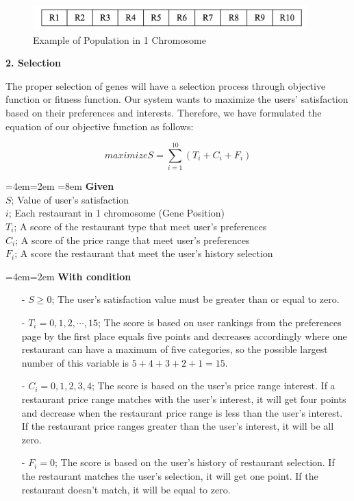 \documentclass[12pt,oneside,openright,a4paper]{cpe-english-project}
\newenvironment{blockquote}{%
  \par%
  \medskip
  \leftskip=4em\rightskip=2em%
  \noindent\ignorespaces}{%
  \par\medskip}
\begin{document}
\begin{figure}[H]\centering
\includegraphics[width=300pt]{./images/3ga_init.png}
\caption{Example of Population in 1 Chromosome}\label{fig:3ga_init}
\end{figure}\vspace{-24pt}

\textbf{2. Selection}\par

The proper selection of genes will have a selection process through objective function or fitness function. Our system wants to maximize the users’ satisfaction based on their preferences and interests. Therefore, we have formulated the equation of our objective function as follows:

\begin{equation}\label{eq:maximizes}
maximize S = \sum_{i=1}^{10}(T_i + C_i + F_i)
\end{equation}

\begin{blockquote}\leftskip=8em
\textbf{Given}\\
$S$; Value of user’s satisfaction\\
$i$; Each restaurant in 1 chromosome (Gene Position)\\
$T_i$; A score of the restaurant type that meet user’s preferences\\
$C_i$; A score of the price range that meet user’s preferences\\
$F_i$; A score  the restaurant that meet the user’s history selection

\end{blockquote}


\begin{blockquote}
\textbf{With condition}
\vspace{-12pt}
\begin{itemize}\leftskip=2em
\item[-] $S \geq 0$; The user’s satisfaction value must be greater than or equal to zero.
\item[-] $T_i=0, 1, 2, \cdots, 15$; The score is based on user rankings from the preferences page by the first place equals five points and decreases accordingly where one restaurant can have a maximum of five categories, so the possible largest number of this variable is $5 + 4 + 3 + 2 + 1 = 15$.
\item[-] $C_i=0,1,2,3,4$; The score is based on the user’s price range interest. If a restaurant price range matches with the user’s interest, it will get four points and decrease when the restaurant price range is less than the user's interest. If the restaurant price ranges greater than the user's interest, it will be all zero.
\item[-] $F_i=0$; The score is based on the user’s history of restaurant selection. If the restaurant matches the user’s selection, it will get one point. If the restaurant doesn’t match, it will be equal to zero.
\end{itemize}
\end{blockquote}
\end{document}
